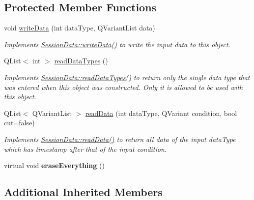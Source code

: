 \subsection*{Protected Member Functions}
\begin{DoxyCompactItemize}
\item 
void \hyperlink{class_current_session_data_a1096941b2edb3bff3cbb60cb4e30c25c}{write\-Data} (int data\-Type, Q\-Variant\-List data)
\begin{DoxyCompactList}\small\item\em Implements \hyperlink{class_session_data_ad05a594d8410d638f1a066bfa5a10ba3}{Session\-Data\-::write\-Data()} to write the input data to this object. \end{DoxyCompactList}\item 
\hypertarget{class_current_session_data_ae2e23db13e0a70a4afefe6343e54a8a0}{Q\-List$<$ int $>$ \hyperlink{class_current_session_data_ae2e23db13e0a70a4afefe6343e54a8a0}{read\-Data\-Types} ()}\label{class_current_session_data_ae2e23db13e0a70a4afefe6343e54a8a0}

\begin{DoxyCompactList}\small\item\em Implements \hyperlink{class_session_data_a4b879f10ecfbfcaa12c2dbbc1b15bdff}{Session\-Data\-::read\-Data\-Types()} to return only the single data type that was entered when this object was constructed. Only it is allowed to be used with this object. \end{DoxyCompactList}\item 
Q\-List$<$ Q\-Variant\-List $>$ \hyperlink{class_current_session_data_a1df3ca686975e2c6049666dc06fd497e}{read\-Data} (int data\-Type, Q\-Variant condition, bool cut=false)
\begin{DoxyCompactList}\small\item\em Implements \hyperlink{class_session_data_a81f4eb49b8a23eb9c1a1575abc2fad4c}{Session\-Data\-::read\-Data()} to return all data of the input data\-Type which has timestamp after that of the input condition. \end{DoxyCompactList}\item 
\hypertarget{class_current_session_data_abb1f488ed6ba05b54a8c3586cb21ed66}{virtual void {\bfseries erase\-Everything} ()}\label{class_current_session_data_abb1f488ed6ba05b54a8c3586cb21ed66}

\end{DoxyCompactItemize}
\subsection*{Additional Inherited Members}


